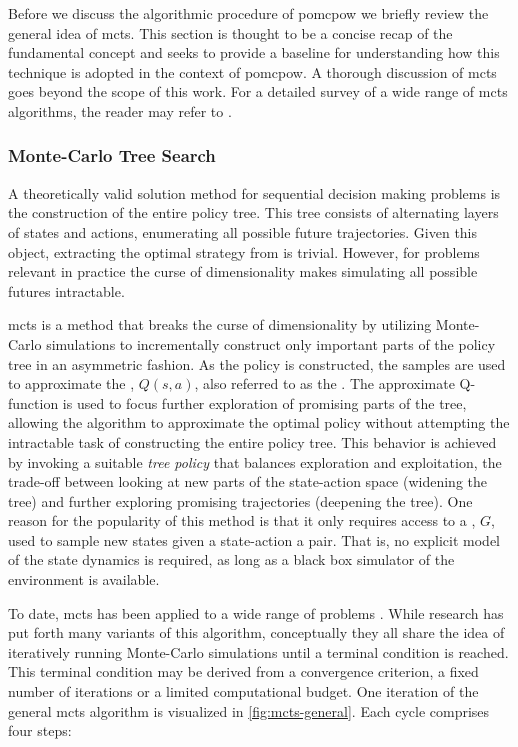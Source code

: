 Before we discuss the algorithmic procedure of \ac{pomcpow} we briefly review
the general idea of \ac{mcts}. This section is thought to be a concise recap of
the fundamental concept and seeks to provide a baseline for understanding how
this technique is adopted in the context of \ac{pomcpow}. A thorough discussion
of \ac{mcts} goes beyond the scope of this work. For a detailed survey of
a wide range of \ac{mcts} algorithms, the reader may refer to
\cite{browne2012survey}.

\subsubsection{Monte-Carlo Tree Search}

A theoretically valid solution method for sequential decision making problems
is the construction of the entire policy tree. This tree consists of alternating
layers of states and actions, enumerating all possible future trajectories.
Given this object, extracting the optimal strategy from is trivial. However,
for problems relevant in practice the curse of dimensionality makes simulating
all possible futures intractable.

\acf{mcts} is a method that breaks the curse of dimensionality by utilizing
Monte-Carlo simulations to incrementally construct only important parts of the
policy tree in an asymmetric fashion. As the policy is constructed, the samples
are used to approximate the , $Q(s, a)$,
also referred to as the . The approximate Q-function is used
to focus further exploration of promising parts of the tree, allowing the
algorithm to approximate the optimal policy without attempting the intractable
task of constructing the entire policy tree. This behavior is achieved by
invoking a suitable \emph{tree policy} that balances exploration and
exploitation, the trade-off between looking at new parts of the state-action
space (widening the tree) and further exploring promising trajectories
(deepening the tree). One reason for the popularity of this method is that
it only requires access to a , $G$, used to sample new states
given a state-action a pair. That is, no explicit model of the state dynamics is
required, as long as a black box simulator of the environment is available.

To date, \ac{mcts} has been applied to a wide range of problems
\cite{browne2012survey}. While research has put forth many variants of this
algorithm, conceptually they all share the idea of iteratively running
Monte-Carlo simulations until a terminal condition is reached. This terminal
condition may be derived from a convergence criterion, a fixed number of
iterations or a limited computational budget. One iteration of the general
\ac{mcts} algorithm is visualized in \cref{fig:mcts-general}. Each cycle
comprises four steps:


